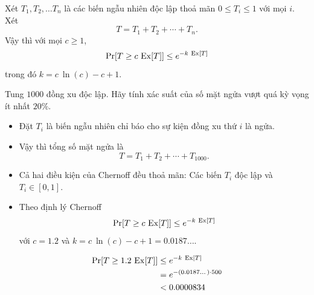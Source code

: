 \begin{frame}
  \begin{thrm}
    Xét $T_1,T_2, \dots T_n$ là các biến ngẫu nhiên độc lập thoả mãn $0\leq T_i \leq 1$ với mọi $i$. Xét 
    \[
      T = T_1 + T_2 + \cdots + T_n.
    \]
    Vậy thì với mọi $c\geq 1$,
    \[
      \pr[T \geq c\ \ex[T]] \leq e^{-k\ \ex[T]}
    \]
    trong đó $k = c\ \ln(c) - c +1$.
  \end{thrm}
\end{frame}
\begin{frame}
  \begin{xmpl}
    Tung $1000$ đồng xu độc lập. Hãy tính xác suất của số mặt ngửa vượt quá kỳ vọng ít nhất $20\%$.
  \end{xmpl}	


\end{frame}

\begin{frame}
  \begin{sol}
    \begin{itemize}
    \item<+-> Đặt $T_i$ là biến ngẫu nhiên chỉ báo cho sự kiện đồng xu thứ $i$ là ngửa.
    \item<+-> Vậy thì tổng số mặt ngửa là 
      \[
        T = T_1 + T_2 + \cdots + T_{1000}.
      \] 
      
    \item<+-> Cả hai điều kiện của Chernoff đều thoả mãn: Các biến $T_i$ độc lập và $T_i \in [0,1]$. 
    \item<+-> Theo định lý Chernoff
      \[
        \pr[T \geq c\ \ex[T]] \leq e^{-k\ \ex[T]}
      \] 
      với $c = 1.2$ và  $k = c\ \ln(c) - c + 1 = 0.0187\dots$.
    \end{itemize}    
  \end{sol}
\end{frame}
\begin{frame}
  \begin{align*}
    \mathrm{Pr}[T \geq 1.2\ \mathrm{Ex}[T]] &\leq e^{-k\ \mathrm{Ex}[T]}\\
                            &= e^{-(0.0187\dots)\cdot 500}\\
                            &< 0.0000834
  \end{align*}
\end{frame}

